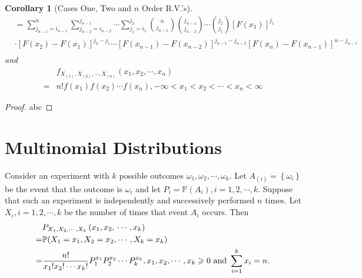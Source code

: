 \documentclass[openany,12pt]{book}
\newtheorem{corollary}{Corollary}[chapter]
\begin{document}
\begin{corollary}[Cases One, Two and $n$ Order R.V.'s]
\[\begin{aligned}
       & = \sum_{j_{n - 1} = i_{n - 1}}^{n}{\sum_{j_{n - 2} = i_{n - 2}}^{j_{n - 1}}\cdots}\sum_{j_{1} = i_{1}}^{j_{2}} \binom{n}{j_{n - 1}}  \binom{j_{n - 1}}{j_{n - 2}} \cdots\binom{j_{2}}{j_{1}}\left[ F( x_{1}) \right]^{j_{1}} \\
       & \cdot\left[ F( x_{2}) - F( x_{1}) \right]^{j_{2} - j_{1}}\cdots \left[ F( x_{n - 1}) - F( x_{n - 2}) \right]^{j_{n - 1} - j_{n - 2}} \left[ F( x_{n}) - F( x_{n - 1}) \right]^{n - j_{n - 1}}                           \\
    \end{aligned}\]
  and
  \[\begin{aligned}
        & f_{X_{\left( 1 \right)},X_{\left( 2 \right)}, \cdots,X_{\left( n \right)}}\left( x_{1},x_{2}, \cdots, x_{n} \right) \\
      = & n!f(x_{1})f(x_{2})\cdots f(x_{n}),    - \infty < x_{1} < x_{2} < \cdots < x_{n} < \infty
    \end{aligned}\]
\end{corollary}

\begin{proof}
  abc
\end{proof}

\section{Multinomial Distributions}

Consider an experiment with $k$ possible outcomes $\omega_{1}, \omega_{2}, \cdots,\omega_{k}$. Let $A_{\left( i \right)} = \left\{ \omega_{i} \right\}$ be the event that the outcome is $\omega_{i}$ and let $P_{i} = \mathbb{P}(A_{i}),i = 1,2, \cdots,k.$ Suppose that such an experiment is independently and successively performed $n$ times. Let $X_{i}, i = 1,2, \cdots,k$ be the number of times that event $A_{i}$ occurs. Then
\[\begin{aligned}
      & P_{X_{1},X_{2}, \cdots,X_{k}}\left( x_{1},x_{2},\, \cdots,x_{k} \right)                                                                               \\
    = & \mathbb{P}( X_{1} = x_{1},X_{2} = x_{2}, \cdots,X_{k} = x_{k})                                                                                       \\
    = & \frac{n!}{x_{1}!x_{2}!\cdots x_{k}!}P_{1}^{x_{1}}P_{2}^{x_{2}}\cdots P_{k}^{x_{k}}, x_{1},x_{2}, \cdots, x_{k} \geqslant 0 ~\text{and}~ \sum_{i=1}^k x_i=n.
  \end{aligned}\]
\end{document}
